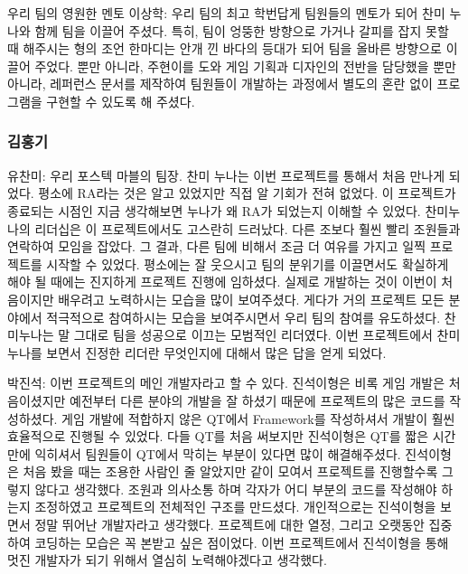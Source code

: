 \documentclass[10pt,oneside,a4paper,titlepage]{article}
\begin{document}
우리 팀의 영원한 멘토 이상학:
 우리 팀의 최고 학번답게 팀원들의 멘토가 되어 찬미 누나와 함께 팀을 이끌어 주셨다. 특히, 팀이 엉뚱한 방향으로 가거나 갈피를 잡지 못할 때 해주시는 형의 조언 한마디는 안개 낀 바다의 등대가 되어 팀을 올바른 방향으로 이끌어 주었다. 뿐만 아니라, 주현이를 도와 게임 기획과 디자인의 전반을 담당했을 뿐만 아니라, 레퍼런스 문서를 제작하여 팀원들이 개발하는 과정에서 별도의 혼란 없이 프로그램을 구현할 수 있도록 해 주셨다.

\subsubsection{김홍기}
유찬미: 우리 포스텍 마블의 팀장. 찬미 누나는 이번 프로젝트를 통해서 처음 만나게 되었다. 평소에 RA라는 것은 알고 있었지만 직접 알 기회가 전혀 없었다. 이 프로젝트가 종료되는 시점인 지금 생각해보면 누나가 왜 RA가 되었는지 이해할 수 있었다. 찬미누나의 리더십은 이 프로젝트에서도 고스란히 드러났다. 다른 조보다 훨씬 빨리 조원들과 연락하여 모임을 잡았다. 그 결과, 다른 팀에 비해서 조금 더 여유를 가지고 일찍 프로젝트를 시작할 수 있었다. 평소에는 잘 웃으시고 팀의 분위기를 이끌면서도 확실하게 해야 될 때에는 진지하게 프로젝트 진행에 임하셨다. 실제로 개발하는 것이 이번이 처음이지만 배우려고 노력하시는 모습을 많이 보여주셨다. 게다가 거의 프로젝트 모든 분야에서 적극적으로 참여하시는 모습을 보여주시면서 우리 팀의 참여를 유도하셨다. 찬미누나는 말 그대로 팀을 성공으로 이끄는 모범적인 리더였다. 이번 프로젝트에서 찬미누나를 보면서 진정한 리더란 무엇인지에 대해서 많은 답을 얻게 되었다.

박진석: 이번 프로젝트의 메인 개발자라고 할 수 있다. 진석이형은 비록 게임 개발은 처음이셨지만 예전부터 다른 분야의 개발을 잘 하셨기 때문에 프로젝트의 많은 코드를 작성하셨다. 게임 개발에 적합하지 않은 QT에서 Framework를 작성하셔서 개발이 훨씬 효율적으로 진행될 수 있었다. 다들 QT를 처음 써보지만 진석이형은 QT를 짧은 시간만에 익히셔서 팀원들이 QT에서 막히는 부분이 있다면 많이 해결해주셨다. 진석이형은 처음 봤을 때는 조용한 사람인 줄 알았지만 같이 모여서 프로젝트를 진행할수록 그렇지 않다고 생각했다. 조원과 의사소통 하며 각자가 어디 부분의 코드를 작성해야 하는지 조정하였고 프로젝트의 전체적인 구조를 만드셨다. 개인적으로는 진석이형을 보면서 정말 뛰어난 개발자라고 생각했다. 프로젝트에 대한 열정, 그리고 오랫동안 집중하여 코딩하는 모습은 꼭 본받고 싶은 점이었다. 이번 프로젝트에서 진석이형을 통해 멋진 개발자가 되기 위해서 열심히 노력해야겠다고 생각했다.
\end{document}
